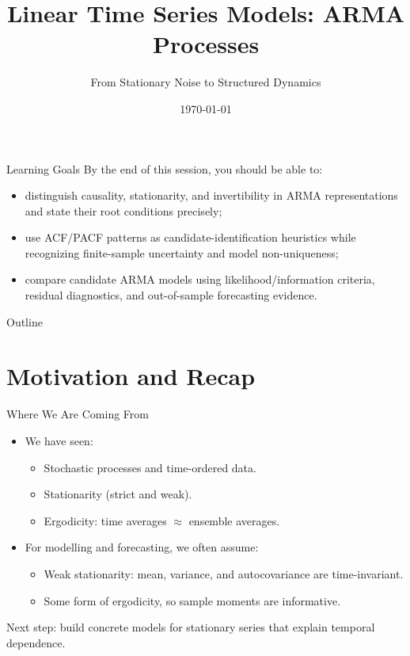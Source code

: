 \documentclass{beamer}
\title[ARMA Models]{Linear Time Series Models: ARMA Processes}
\subtitle{From Stationary Noise to Structured Dynamics}
\date{\today}
\begin{document}

\begin{frame}
  \titlepage
\end{frame}

\begin{frame}{Learning Goals}
  By the end of this session, you should be able to:
  \begin{itemize}
    \item distinguish causality, stationarity, and invertibility in ARMA representations and state their root conditions precisely;
    \item use ACF/PACF patterns as candidate-identification heuristics while recognizing finite-sample uncertainty and model non-uniqueness;
    \item compare candidate ARMA models using likelihood/information criteria, residual diagnostics, and out-of-sample forecasting evidence.
  \end{itemize}
\end{frame}

\begin{frame}{Outline}
  \tableofcontents
\end{frame}

\section{Motivation and Recap}

\begin{frame}{Where We Are Coming From}
  \begin{itemize}
    \item We have seen:
      \begin{itemize}
        \item Stochastic processes and time-ordered data.
        \item Stationarity (strict and weak).
        \item Ergodicity: time averages $\approx$ ensemble averages.
      \end{itemize}
    \item For modelling and forecasting, we often assume:
      \begin{itemize}
        \item Weak stationarity: mean, variance, and autocovariance are time-invariant.
        \item Some form of ergodicity, so sample moments are informative.
      \end{itemize}
  \end{itemize}

  \vspace{0.3cm}
  Next step: build concrete models for stationary series that explain temporal dependence.
\end{frame}
\end{document}
